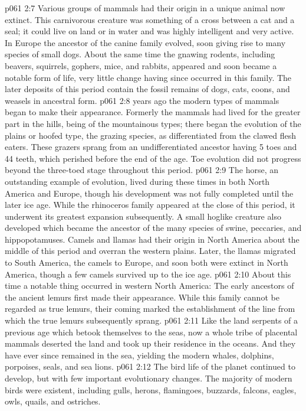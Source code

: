 \vs p061 2:7 Various groups of mammals had their origin in a unique animal now extinct. This carnivorous creature was something of a cross between a cat and a seal; it could live on land or in water and was highly intelligent and very active. In Europe the ancestor of the canine family evolved, soon giving rise to many species of small dogs. About the same time the gnawing rodents, including beavers, squirrels, gophers, mice, and rabbits, appeared and soon became a notable form of life, very little change having since occurred in this family. The later deposits of this period contain the fossil remains of dogs, cats, coons, and weasels in ancestral form.
\vs p061 2:8 \pc {} years ago the modern types of mammals began to make their appearance. Formerly the mammals had lived for the greater part in the hills, being of the mountainous types;  there began the evolution of the plains or hoofed type, the grazing species, as differentiated from the clawed flesh eaters. These grazers sprang from an undifferentiated ancestor having 5 toes and 44 teeth, which perished before the end of the age. Toe evolution did not progress beyond the three\hyp{}toed stage throughout this period.
\vs p061 2:9 The horse, an outstanding example of evolution, lived during these times in both North America and Europe, though his development was not fully completed until the later ice age. While the rhinoceros family appeared at the close of this period, it underwent its greatest expansion subsequently. A small hoglike creature also developed which became the ancestor of the many species of swine, peccaries, and hippopotamuses. Camels and llamas had their origin in North America about the middle of this period and overran the western plains. Later, the llamas migrated to South America, the camels to Europe, and soon both were extinct in North America, though a few camels survived up to the ice age.
\vs p061 2:10 About this time a notable thing occurred in western North America: The early ancestors of the ancient lemurs first made their appearance. While this family cannot be regarded as true lemurs, their coming marked the establishment of the line from which the true lemurs subsequently sprang.
\vs p061 2:11 Like the land serpents of a previous age which betook themselves to the seas, now a whole tribe of placental mammals deserted the land and took up their residence in the oceans. And they have ever since remained in the sea, yielding the modern whales, dolphins, porpoises, seals, and sea lions.
\vs p061 2:12 The bird life of the planet continued to develop, but with few important evolutionary changes. The majority of modern birds were existent, including gulls, herons, flamingoes, buzzards, falcons, eagles, owls, quails, and ostriches.
